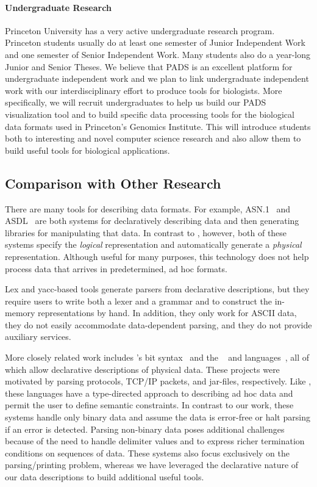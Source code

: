 \documentclass[11pt]{article}
\begin{document}
\paragraph*{Undergraduate Research}
Princeton University has a very active undergraduate research program.
Princeton students usually do at least one semester of
Junior Independent Work and one semester of Senior Independent Work. 
Many students also do a year-long
Junior and Senior Theses.  We believe that PADS is an excellent
platform for undergraduate independent work and we plan to link
undergraduate independent work with our interdisciplinary effort to
produce tools for biologists.
More specifically, we will recruit undergraduates to help us
build our PADS visualization tool and to build
specific data processing tools for the biological data formats
used in Princeton's Genomics Institute.
This will introduce students both to interesting and novel
computer science research and also allow them to build useful
tools for biological applications. 

\subsection{Comparison with Other Research}
\label{ssec:related}

There are many tools for describing data formats. For example,
\textsc{ASN.1}~\cite{asn} and \textsc{ASDL}~\cite{asdl} are both
systems for declaratively describing data and then generating
libraries for manipulating that data.  In contrast to \pads{},
however, both of these systems specify the {\em logical\/} representation
and automatically generate a {\em physical\/} representation.
Although useful for many purposes, this technology does not help
process data that arrives in predetermined, ad hoc formats.

Lex and yacc-based tools generate parsers from declarative
descriptions, but they require users to write both a lexer and a
grammar and to construct the in-memory representations by hand.  In
addition, they only work for ASCII data, they do not easily
accommodate data-dependent parsing, and they do not provide auxiliary
services.

More closely related work includes \erlang{}'s bit syntax~\cite{erlang} and
the \packettypes{}~\cite{sigcomm00} and
\datascript{} languages~\cite{gpce02}, 
all of which allow declarative descriptions of physical data.  These projects were motivated by parsing protocols,
\textsc{TCP/IP} packets, and \java{} jar-files, respectively.  Like
\pads{}, these languages have a type-directed approach to
describing ad hoc data and permit the user to define semantic constraints.
In contrast to our
work, these systems handle only binary data and assume the data is
error-free or halt parsing if an error is detected. 
Parsing non-binary data poses additional challenges because of the need
to handle delimiter values and to express richer termination conditions
on sequences of data. These systems also
focus exclusively on the parsing/printing problem, whereas we have 
leveraged the declarative nature of
our data descriptions to build additional useful tools.
\end{document}
